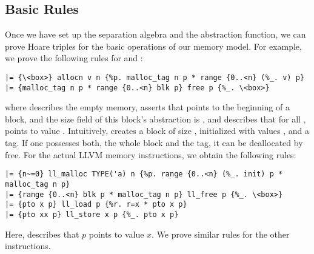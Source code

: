 \documentclass[a4paper,oribibl,envcountsame]{llncs}
\begin{document}
\subsection{Basic Rules}
Once we have set up the separation algebra and the abstraction function, we can prove Hoare triples for the basic operations of our memory model.
For example, we prove the following rules for  and :
\begin{lstlisting}
|= {\<box>} allocn v n {%p. malloc_tag n p * range {0..<n} (%_. v) p}
|= {malloc_tag n p * range {0..<n} blk p} free p {%_. \<box>}
\end{lstlisting}
where  describes the empty memory, 
 asserts that  points to the beginning of a block, and the size field of this block's abstraction is , 
and  describes that for all ,  points to value .
Intuitively,  creates a block of size , initialized with values , and a tag. 
If one possesses both, the whole block and the tag, it can be deallocated by free. 
For the actual LLVM memory instructions, we obtain the following rules:
\begin{lstlisting}
|= {n~=0} ll_malloc TYPE('a) n {%p. range {0..<n} (%_. init) p * malloc_tag n p}
|= {range {0..<n} blk p * malloc_tag n p} ll_free p {%_. \<box>}
|= {pto x p} ll_load p {%r. r=x * pto x p}
|= {pto xx p} ll_store x p {%_. pto x p}
\end{lstlisting}
Here,  describes that $p$ points to value $x$. We prove similar rules for the other instructions.
\end{document}
